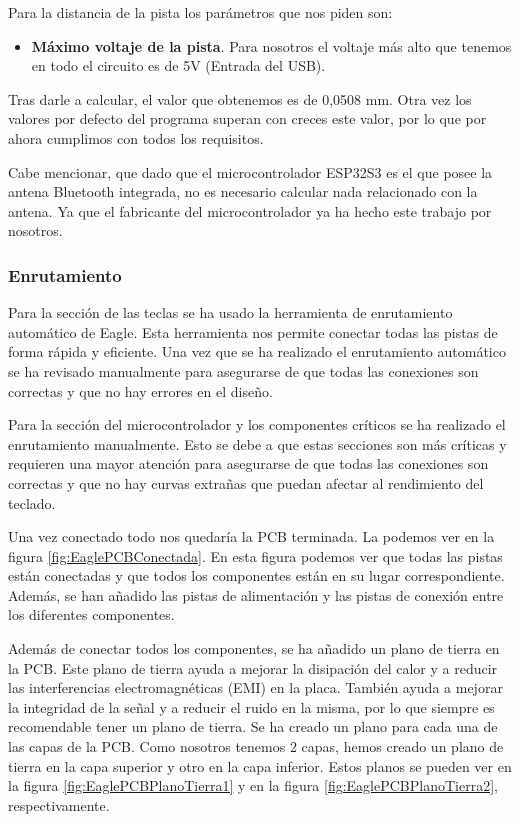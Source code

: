 Para la distancia de la pista los parámetros que nos piden son:
\begin{itemize}
    \item \textbf{Máximo voltaje de la pista}. Para nosotros el voltaje más alto que tenemos en todo el circuito es de 5V (Entrada del \gls{USB}).
\end{itemize}

Tras darle a calcular, el valor que obtenemos es de 0,0508 mm. Otra vez los valores por defecto del programa superan con creces este valor, por lo que por ahora cumplimos con todos los requisitos.

Cabe mencionar, que dado que el microcontrolador ESP32S3 es el que posee la antena \gls{Bluetooth} integrada, no es necesario calcular nada relacionado con la antena. Ya que el fabricante del microcontrolador ya ha hecho este trabajo por nosotros.

\subsubsection{Enrutamiento}
Para la sección de las teclas se ha usado la herramienta de enrutamiento automático de Eagle. Esta herramienta nos permite conectar todas las pistas de forma rápida y eficiente. Una vez que se ha realizado el enrutamiento automático se ha revisado manualmente para asegurarse de que todas las conexiones son correctas y que no hay errores en el diseño.

Para la sección del microcontrolador y los componentes críticos se ha realizado el enrutamiento manualmente. Esto se debe a que estas secciones son más críticas y requieren una mayor atención para asegurarse de que todas las conexiones son correctas y que no hay curvas extrañas que puedan afectar al rendimiento del teclado.

Una vez conectado todo nos quedaría la \gls{PCB} terminada. La podemos ver en la figura \ref{fig:EaglePCBConectada}. En esta figura podemos ver que todas las pistas están conectadas y que todos los componentes están en su lugar correspondiente. Además, se han añadido las pistas de alimentación y las pistas de conexión entre los diferentes componentes.

Además de conectar todos los componentes, se ha añadido un plano de tierra en la \gls{PCB}. Este plano de tierra ayuda a mejorar la disipación del calor y a reducir las interferencias electromagnéticas (EMI) en la placa. También ayuda a mejorar la integridad de la señal y a reducir el ruido en la misma, por lo que siempre es recomendable tener un plano de tierra. Se ha creado un plano para cada una de las capas de la \gls{PCB}. Como nosotros tenemos 2 capas, hemos creado un plano de tierra en la capa superior y otro en la capa inferior.
Estos planos se pueden ver en la figura \ref{fig:EaglePCBPlanoTierra1} y en la figura \ref{fig:EaglePCBPlanoTierra2}, respectivamente.

